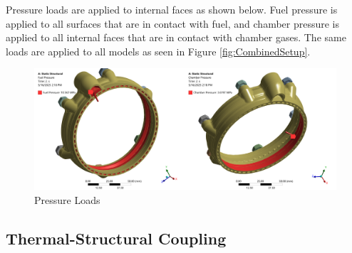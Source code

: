 Pressure loads are applied to internal faces as shown below. Fuel pressure is applied to all surfaces that are in contact with fuel, and chamber pressure is applied to all internal faces that are in contact with chamber gases. The same loads are applied to all models as seen in Figure \ref{fig:CombinedSetup}.
\begin{figure}
    \centering
    \includegraphics[width=1\linewidth]{Images/Pressure Loads.png}
    \caption{Pressure Loads}
    \label{fig:Pressure Loads}
\end{figure}
\subsection{Thermal-Structural Coupling}

